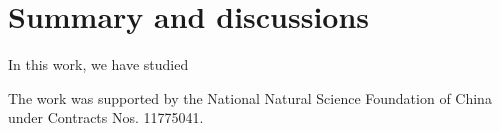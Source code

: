 \documentclass[%
reprint,
superscriptaddress,
showpacs,preprintnumbers,
 amsmath,amssymb,
 aps,
prd,
]{revtex4-1}
\begin{document}

\section{Summary and discussions}
\label{sec:sum}

In this work, we have studied


\begin{acknowledgments}

The work was supported by the National Natural Science Foundation of China under Contracts Nos. 11775041.

\end{acknowledgments}




\end{document}
